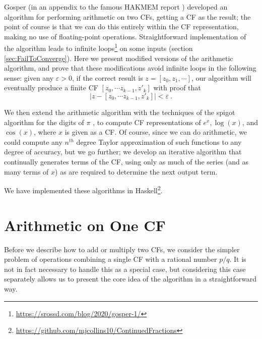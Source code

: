 \documentclass[11pt, oneside]{amsart}   	%
\renewcommand{\:}{\negthickspace:\negthickspace}
\begin{document}
Gosper (in an appendix to the famous HAKMEM report \cite{hakmem}) 
developed an algorithm for performing arithmetic on two CFs, getting a CF as the result;
the point of course is that we can do this entirely within the CF representation, making no use of floating-point operations. Straightforward implementation of the algorithm leads to infinite loops\footnote{\href{https://srossd.com/blog/2020/gosper-1/}{https://srossd.com/blog/2020/gosper-1/}} on some inputs (section \ref{sec:FailToConverge}).
Here we present modified versions of the arithmetic algorithm, and prove that these modifications avoid infinite loops in the following sense: given any $\varepsilon > 0$, if the correct result is $z=[z_0,z_1,\cdots]$, our algorithm will eventually produce a finite CF $[z_0, \cdots z_{k-1}, z'_k]$ with proof that 
\[
|z - [z_0, \cdots z_{k-1}, z'_k]| < \varepsilon\ .
\]

We then extend the arithmetic algorithm with the techniques of the spigot algorithm for the digits of $\pi$ \cite{Gibbons2016,Rabinowitz2016}, to compute CF representations of $e^x, \log(x)$, and  $\cos(x)$, where $x$ is given as a CF. 
Of course, since we can do arithmetic, we could compute any $n^{th}$ degree Taylor approximation of such functions to any degree of accuracy, but we go further;
we develop an iterative algorithm that continually generates terms of the CF, using only as much of the series (and as many terms of $x$) as are required to determine the next output term.

We have implemented these algorithms
in Haskell\footnote{\href{https://github.com/mjcollins10/ContinuedFractions}{https://github.com/mjcollins10/ContinuedFractions}}.


\section{Arithmetic on One CF}
Before we describe how to add or multiply two CFs, we consider the simpler problem of operations combining a single CF with a
rational number $p/q$. It is not in fact necessary to handle this as a special case, but considering this case separately allows us to present the core idea of the algorithm in a straightforward way.
\end{document}
